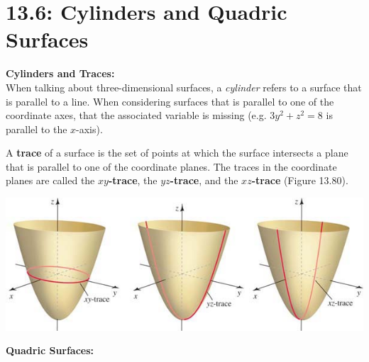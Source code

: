 \documentclass[mathNotesPreamble]{subfiles}
\begin{document}
\section{13.6: Cylinders and Quadric Surfaces}
  \textbf{Cylinders and Traces:}\\
    When talking about three-dimensional surfaces, a \textit{cylinder} refers to a surface that is parallel to a line. When considering surfaces that is parallel to one of the coordinate axes, that the associated variable is missing (e.g. $3y^2+z^2=8$ is parallel to the $x$-axis).
  
  \begin{defn*}[Trace]
    A \textbf{trace} of a surface is the set of points at which the surface intersects a plane that is parallel to one of the coordinate planes. The traces in the coordinate planes are called the \textbf{$xy$-trace}, the \textbf{$yz$-trace}, and the \textbf{$xz$-trace} (Figure 13.80).
  \end{defn*}
  \begin{center}
    \includegraphics[width=0.75\linewidth]{images/briggs_13_06/fig13_80}
  \end{center}
  \pagebreak
  
  
  
  \textbf{Quadric Surfaces:}
  
\end{document}

